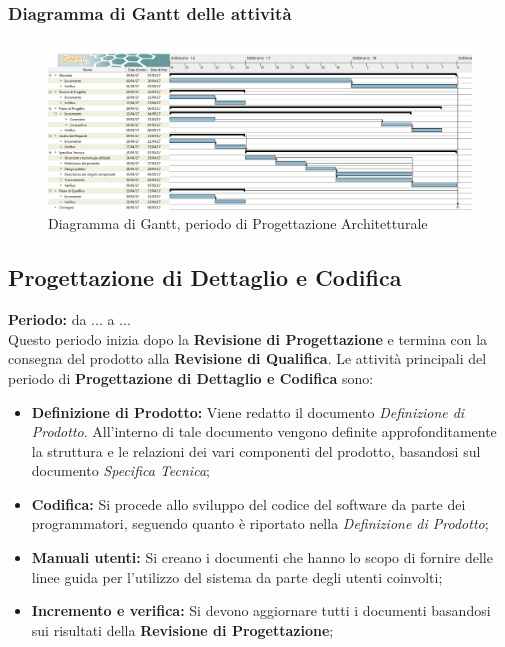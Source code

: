 	\subsubsection{Diagramma di Gantt delle attività}
	\begin{figure}[H]
		\centering
		\includegraphics[width=1\linewidth]{immagini/gantt/progettazione_architetturale.png}
		\caption{Diagramma di Gantt, periodo di Progettazione Architetturale}
	\end{figure}
	\subsection{Progettazione di Dettaglio e Codifica}
	\textbf{Periodo:} da ... a ... \\
	Questo periodo inizia dopo la \textbf{Revisione di Progettazione} e termina con la consegna del prodotto alla \textbf{Revisione di Qualifica}. Le attività principali del periodo di \textbf{Progettazione di Dettaglio e Codifica} sono: \\
	\begin{itemize}
		\item \textbf{Definizione di Prodotto:} Viene redatto il documento \textit{Definizione di Prodotto}. All'interno di tale documento vengono definite approfonditamente la struttura e le relazioni dei vari componenti del prodotto, basandosi sul documento \textit{Specifica Tecnica}; \\
		\item \textbf{Codifica:} Si procede allo sviluppo del codice del software da parte dei programmatori, seguendo quanto è riportato nella \textit{Definizione di Prodotto}; \\
		\item \textbf{Manuali utenti:} Si creano i documenti che hanno lo scopo di fornire delle linee guida per l'utilizzo del sistema da parte degli utenti coinvolti; \\
		\item \textbf{Incremento e verifica:} Si devono aggiornare tutti i documenti basandosi sui risultati della \textbf{Revisione di Progettazione}; \\
	\end{itemize}
